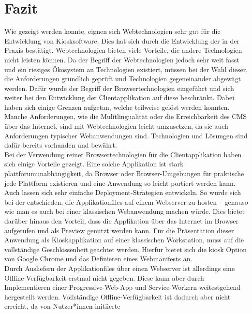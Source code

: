 \chapter{Fazit}
\label{chap:fazit}

Wie gezeigt werden konnte, eignen sich Webtechnologien sehr gut für
die Entwicklung von Kiosksoftware. Dies hat sich durch die Entwicklung
der \shst{} in der Praxis bestätigt. Webtechnologien bieten viele Vorteile, die andere
Technologien nicht leisten können. Da der Begriff der Webtechnologien jedoch
sehr weit fasst und ein riesiges Ökosystem an Technologien existiert, müssen bei
der Wahl dieser, die Anforderungen gründlich geprüft und Technologien gegeneinander 
abgewägt werden. Dafür wurde der Begriff der Browsertechnologien eingeführt und sich
weiter bei den Entwicklung der Clientapplikation auf diese beschränkt. 
Dabei haben sich einige Grenzen aufgetan, welche teilweise gelöst werden konnten.\\
Manche Anforderungen, wie die Mulitlingualität oder die Erreichbarkeit des CMS über das Internet,
sind mit Webtechnologien leicht umzusetzen, da sie auch Anforderungen typischer Webanwendungen sind.
Technologien und Lösungen sind dafür bereits vorhanden und bewährt.\\
Bei der Verwendung reiner Browsertechnologien für die Clientapplikation haben sich einige Vorteile 
gezeigt. Eine solche Applikation ist stark plattforumunabhängigkeit, da Browser oder Browser-Umgebungen
für praktische jede Plattform existieren und eine Anwendung so leicht portiert werden kann. Auch lassen
sich sehr einfache Deployment-Strategien entwickeln. So wurde sich bei der \shst{} entschieden, die
Applikationfiles auf einem Webserver zu hosten -- genauso wie man es auch bei einer klassischen %
Webanwendung machen würde. Dies bietet darüber hinaus den Vorteil, dass die Applikation über das Internet
im Browser aufgerufen und als Preview genutzt werden kann. Für die Präsentation dieser Anwendung als
Kioskapplikation auf einer klassischen Workstation, muss auf die vollständige Geschlossenheit geachtet werden.
Hierfür bietet sich die kiosk Option von Google Chrome und das Definieren eines Webmanifests an.\\
Durch Ausliefern der Applikationfiles über einen Webserver ist allerdings eine Offline-Verfügbarkeit
erstmal nicht gegeben. Diese kann aber durch Implementieren einer Progressive-Web-App und 
Service-Workern weitestgehend hergestellt werden.
Vollständige Offline-Verfügbarkeit ist dadurch aber nicht erreicht, da von Nutzer*innen initiierte

